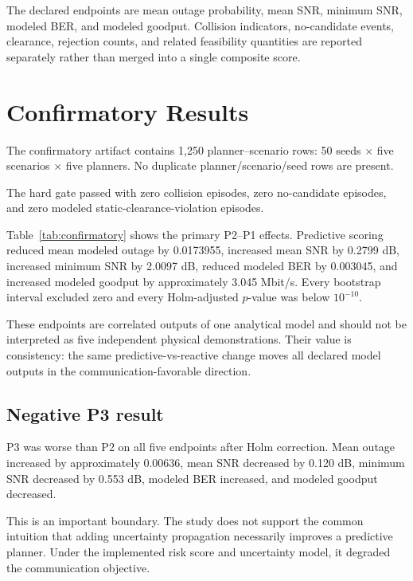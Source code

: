 \documentclass[journal]{IEEEtran}
\begin{document}
The declared endpoints are mean outage probability, mean SNR, minimum SNR, modeled BER, and modeled goodput. Collision indicators, no-candidate events, clearance, rejection counts, and related feasibility quantities are reported separately rather than merged into a single composite score.

\section{Confirmatory Results}
The confirmatory artifact contains 1,250 planner--scenario rows: 50 seeds $\times$ five scenarios $\times$ five planners. No duplicate planner/scenario/seed rows are present.

The hard gate passed with zero collision episodes, zero no-candidate episodes, and zero modeled static-clearance-violation episodes.

\begin{table}[t]
\caption{Confirmatory P2--P1 seed-level effects. CI denotes the deterministic 95\% bootstrap interval; $p_H$ is Holm adjusted.}
\label{tab:confirmatory}
\centering
\small
\resizebox{\columnwidth}{!}{}
\end{table}

Table~\ref{tab:confirmatory} shows the primary P2--P1 effects. Predictive scoring reduced mean modeled outage by 0.0173955, increased mean SNR by 0.2799 dB, increased minimum SNR by 2.0097 dB, reduced modeled BER by 0.003045, and increased modeled goodput by approximately 3.045 Mbit/s. Every bootstrap interval excluded zero and every Holm-adjusted $p$-value was below $10^{-10}$.

These endpoints are correlated outputs of one analytical model and should not be interpreted as five independent physical demonstrations. Their value is consistency: the same predictive-vs-reactive change moves all declared model outputs in the communication-favorable direction.

\subsection{Negative P3 result}
P3 was worse than P2 on all five endpoints after Holm correction. Mean outage increased by approximately 0.00636, mean SNR decreased by 0.120 dB, minimum SNR decreased by 0.553 dB, modeled BER increased, and modeled goodput decreased.

This is an important boundary. The study does not support the common intuition that adding uncertainty propagation necessarily improves a predictive planner. Under the implemented risk score and uncertainty model, it degraded the communication objective.
\end{document}
